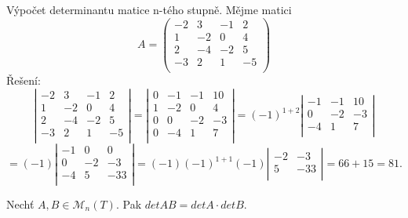 \begin{example}
	Výpočet determinantu matice n-tého stupně. Mějme matici $$A = \left( \begin{array}{cccc} -2 & 3 & -1 & 2\\ 1 & -2 & 0 & 4\\ 2 & -4 & -2 & 5\\ -3 & 2 & 1 & -5\\ \end{array} \right)$$
	Řešení: 
	\begin{displaymath}
		\left| 
		\begin{array}{cccc}
			-2 & 3 & -1 & 2\\ 
			1 & -2 & 0 & 4\\ 
			2 & -4 & -2 & 5\\ 
			-3 & 2 & 1 & -5\\
		\end{array} \right| = 
		\left| 
		\begin{array}{cccc}
			0 & -1 & -1 & 10\\ 
			1 & -2 & 0 & 4\\ 
			0 & 0 & -2 & -3\\ 
			0 & -4 & 1 & 7\\
		\end{array}\right| = (-1)^{1+2}
		\left| 
		\begin{array}{ccc}
			 -1 & -1 & 10\\ 
			 0 & -2 & -3\\ 
			 -4 & 1 & 7\\
		\end{array}\right| 
		\end{displaymath}
		\begin{displaymath}
		= (-1)
		\left| 
		\begin{array}{ccc}
			 -1 & 0 & 0 \\ 
			0 & -2 & -3 \\ 
			-4 & 5 & -33 \\ 
		\end{array}\right| = (-1)(-1)^{1+1}(-1) 
		\left| 
		\begin{array}{cc}
			 -2 & -3 \\ 
			 5 & -33 \\  
		\end{array}\right| = 66 + 15 = 81.
	\end{displaymath}
	
\end{example}

\begin{sentence}
	Nechť $A,B \in \mathscr{M}_n(T)$. Pak $detAB = detA \cdot detB$.
\end{sentence}

